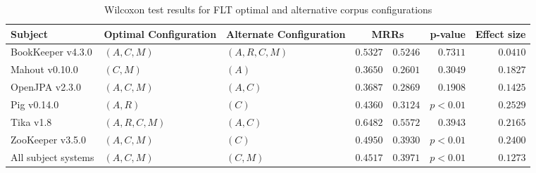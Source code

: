 \begin{landscape}

\begin{table}
\begin{spacing}{1.2}
\centering
\caption{Wilcoxon test results for FLT optimal and alternative corpus configurations}
\label{table:combo-flt-corpus-sweep-wilcox}
\begin{tabular}{lllrrrr}
\toprule
                      Subject & Optimal Configuration & Alternate Configuration & \multicolumn{2}{c}{MRRs}  &  p-value & Effect size \\
\midrule
            BookKeeper v4.3.0 &           $(A, C, M)$ &          $(A, R, C, M)$ &    $0.5327$ &      $0.5246$ & $0.7311$ &    $0.0410$ \\
               Mahout v0.10.0 &              $(C, M)$ &                   $(A)$ &    $0.3650$ &      $0.2601$ & $0.3049$ &    $0.1827$ \\
               OpenJPA v2.3.0 &           $(A, C, M)$ &                $(A, C)$ &    $0.3687$ &      $0.2869$ & $0.1908$ &    $0.1425$ \\
                  Pig v0.14.0 &              $(A, R)$ &                   $(C)$ &    $0.4360$ &      $0.3124$ & $p<0.01$ &    $0.2529$ \\
                    Tika v1.8 &        $(A, R, C, M)$ &                $(A, C)$ &    $0.6482$ &      $0.5572$ & $0.3943$ &    $0.2165$ \\
             ZooKeeper v3.5.0 &           $(A, C, M)$ &                   $(C)$ &    $0.4950$ &      $0.3930$ & $p<0.01$ &    $0.2400$ \\
 \midrule
All subject systems &           $(A, C, M)$ &                $(C, M)$ &    $0.4517$ &      $0.3971$ & $p<0.01$ &    $0.1273$ \\
\bottomrule
\end{tabular}

\end{spacing}
\end{table}



\end{landscape}

